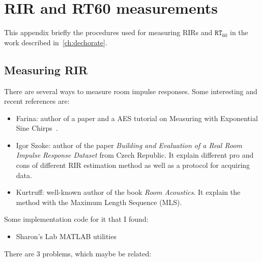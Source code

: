 \chapter{RIR and RT60 measurements}\label{ap:rir}

  This appendix briefly the procedures used for measuring \acp{RIR} and $\mathtt{RT}_{60}$ in the work described in~\cref{ch:dechorate}.

\section{Measuring RIR}\label{sec:rir:rir}

There are several ways to measure room impulse responses. Some interesting and recent references are:
\begin{itemize}
    \item Farina: author of a paper and a AES tutorial on Measuring with Exponential Sine Chirps~.
    \item Igor Szoke: author of the paper \textit{Building and Evaluation of a Real Room Impulse Response Dataset}
    from Czech Republic.
    It explain different pro and cons of different RIR estimation method as well as a protocol for acquiring data.
    \item Kurtruff: well-known author of the book \textit{Room Acoustics}. It explain the method with the Maximum Length Sequence (MLS).
\end{itemize}

Some implementation code for it that I found:

\begin{itemize}
    \item Sharon's Lab MATLAB utilities

\end{itemize}

There are 3 problems, which maybe be related:

